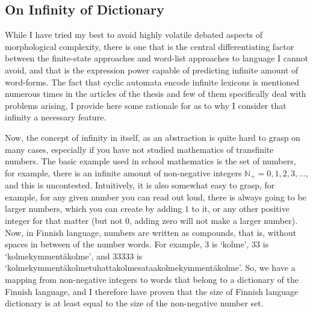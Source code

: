 \documentclass[officiallayout]{unihelcompling}
\begin{document}
\subsection{On Infinity of Dictionary}
\label{subsec:infinity}

While I have tried my best to avoid highly volatile debated aspects of
\gls{morphological complexity}, there is one that is the central
differentiating factor between the finite-state approaches and word-list
approaches to language I cannot avoid, and that is the expression power capable
of predicting infinite amount of word-forms. The fact that cyclic automata
encode infinite lexicons is mentioned numerous times in the articles of the
thesis and few of them specifically deal with problems arising, I provide here
some rationale for as to why I consider that infinity a necessary feature.

Now, the concept of infinity in itself, as an abstraction is quite hard to
grasp on many cases, especially if you have not studied mathematics of
transfinite numbers. The basic example used in school mathematics is the set of
numbers, for example, there is an infinite amount of non-negative integers
$\mathbb{N}_+ = 0, 1, 2, 3, \ldots$, and this is uncontested. Intuitively, it
is also somewhat easy to grasp, for example, for any given number you can read
out loud, there is always going to be larger numbers, which you can create by
adding $1$ to it, or any other positive integer for that matter (but not $0$,
adding zero will not make a larger number). Now, in Finnish language, numbers
are written as compounds, that is, without spaces in between of the number
words.  For example, 3 is `kolme', 33 is `kolmekymmentäkolme', and 33333 is
`kolmekymmentäkolmetuhattakolmesataakolmekymmentäkolme'. So, we have a mapping
from non-negative integers to words that belong to a dictionary of the Finnish
language, and I therefore have proven that the size of Finnish language
dictionary is at least equal to the size of the non-negative number
set.
\end{document}
